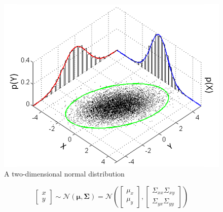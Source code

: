 \documentclass[12pt,a4paper]{article}
\begin{document}
\begin{figure}[H]
	\centering
	\includegraphics[scale=0.45]{images/2D_normal_distribution.png}
	\caption{A two-dimensional normal distribution}
\end{figure}

$$
\left[\begin{array}{l}
x \\
y
\end{array}\right] \sim \mathcal{N}(\boldsymbol{\mu}, \boldsymbol{\Sigma})=\mathcal{N}\left(\left[\begin{array}{l}
\mu_{x} \\
\mu_{y}
\end{array}\right],\left[\begin{array}{l}
\Sigma_{x x} \Sigma_{x y} \\
\Sigma_{y x} \Sigma_{y y}
\end{array}\right]\right)
$$
\end{document}
